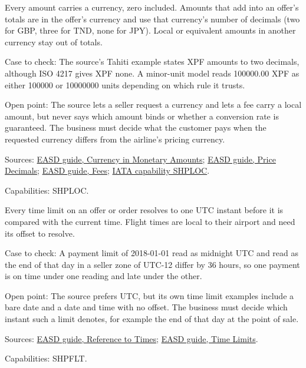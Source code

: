 \begin{definition}
  \label{def:offers-offer-currency}
  \notready
  Every amount carries a currency, zero included. Amounts that add into an
  offer's totals are in the offer's currency and use that currency's number
  of decimals (two for GBP, three for TND, none for JPY). Local or
  equivalent amounts in another currency stay out of totals.

  Case to check: The source's Tahiti example states XPF amounts to two
  decimals, although ISO 4217 gives XPF none. A minor-unit model reads
  100000.00 XPF as either 100000 or 10000000 units depending on which rule
  it trusts.

  Open point: The source lets a seller request a currency and lets a fee
  carry a local amount, but never says which amount binds or whether a
  conversion rate is guaranteed. The business must decide what the customer
  pays when the requested currency differs from the airline's pricing
  currency.

  Sources: \href{https://standards.atlassian.net/wiki/spaces/EASD/pages/749305864/Currency+in+Monetary+Amounts}{EASD guide, Currency in Monetary Amounts};
  \href{https://standards.atlassian.net/wiki/spaces/EASD/pages/574685264/Price+Decimals}{EASD guide, Price Decimals};
  \href{https://standards.atlassian.net/wiki/spaces/EASD/pages/574914636/Fees}{EASD guide, Fees};
  \href{https://retailing.iata.org/armi/docs/SHPLOC/}{IATA capability SHPLOC}.

  Capabilities: SHPLOC.
\end{definition}

\begin{definition}
  \label{def:offers-time-limits-as-instants}
  \notready
  Every time limit on an offer or order resolves to one UTC instant before
  it is compared with the current time. Flight times are local to their
  airport and need its offset to resolve.

  Case to check: A payment limit of 2018-01-01 read as midnight UTC and read
  as the end of that day in a seller zone of UTC-12 differ by 36 hours, so
  one payment is on time under one reading and late under the other.

  Open point: The source prefers UTC, but its own time limit examples
  include a bare date and a date and time with no offset. The business must
  decide which instant such a limit denotes, for example the end of that day
  at the point of sale.

  Sources: \href{https://standards.atlassian.net/wiki/spaces/EASD/pages/574488607/Reference+to+Times}{EASD guide, Reference to Times};
  \href{https://standards.atlassian.net/wiki/spaces/EASD/pages/574423066/Time+Limits}{EASD guide, Time Limits}.

  Capabilities: SHPFLT.
\end{definition}
